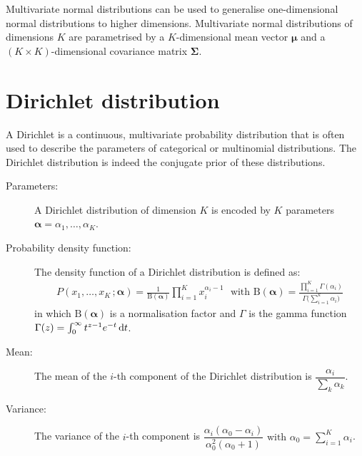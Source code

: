 Multivariate normal distributions can be used to generalise one-dimensional normal distributions to higher dimensions. Multivariate normal distributions of dimensions $K$ are parametrised by a $K$-dimensional mean vector $\boldsymbol\mu$ and a $(K \times K)$-dimensional covariance matrix $\boldsymbol\Sigma$. 

\section*{Dirichlet distribution}

A Dirichlet is a continuous, multivariate probability distribution that is often used to describe the parameters of categorical or multinomial distributions.  The Dirichlet distribution is indeed the conjugate prior of these distributions. 

\begin{description}
\item [Parameters: ] A Dirichlet distribution of dimension $K$ is encoded by $K$ parameters $\boldsymbol\alpha = \alpha_1, \dots, \alpha_K$. 

\item [Probability density function: ] The density function of a Dirichlet distribution is defined as:
\begin{align}
P(x_1, \dots, x_K\,; \boldsymbol\alpha) = \frac{1}{\mathrm{B}(\boldsymbol\alpha)} \prod_{i=1}^K x_i^{\alpha_i - 1} \ \ \ \text{with } \mathrm{B}(\boldsymbol\alpha) = \frac{\prod_{i=1}^K \Gamma(\alpha_i)}{\Gamma\bigl(\sum_{i=1}^k \alpha_i\bigr)}
\end{align}
in which $ \mathrm{B}(\boldsymbol\alpha)$ is a normalisation factor and $\Gamma$ is the gamma function $\Gamma(z) = \int_0^\infty  t^{z-1} e^{-t}\,{\rm d}t$. 

\item [Mean: ] The mean of the $i$-th component of the Dirichlet distribution is $\dfrac{\alpha_i}{\sum_k \alpha_k}$.

\item [Variance: ] The variance of the $i$-th component is $\dfrac{\alpha_i (\alpha_0-\alpha_i)}{\alpha_0^2 (\alpha_0+1)} \text{ with } \alpha_0 = \sum_{i=1}^K\alpha_i$.

\end{description}

